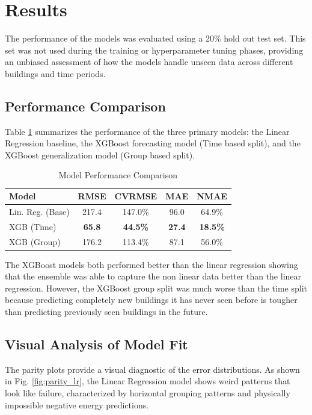 \documentclass[conference]{IEEEtran}
\begin{document}
\section{Results}
The performance of the models was evaluated using a 20\% hold out test set. This set was not used during the training or hyperparameter tuning phases, providing an unbiased assessment of how the models handle unseen data across different buildings and time periods.
\subsection{ Performance Comparison}
Table \ref{table:model_results} summarizes the performance of the three primary models: the Linear Regression baseline, the XGBoost forecasting model (Time based split), and the XGBoost generalization model (Group based split). 

\begin{table}[h]
\centering
\caption{Model Performance Comparison}
\label{table:model_results}
\setlength{\tabcolsep}{3pt}
\begin{tabular}{|l|c|c|c|c|}
\hline
\textbf{Model} & \textbf{RMSE} & \textbf{CVRMSE} & \textbf{MAE} & \textbf{NMAE} \\ \hline
Lin. Reg. (Base) & 217.4 & 147.0\% & 96.0 & 64.9\% \\ \hline
XGB (Time)       & \textbf{65.8}  & \textbf{44.5\%}  & \textbf{27.4} & \textbf{18.5\%} \\ \hline
XGB (Group)      & 176.2 & 113.4\% & 87.1 & 56.0\% \\ \hline
\end{tabular}
\end{table}

The XGBoost models both performed better than the linear regression showing that the ensemble was able to capture the non linear data better than the linear regression. However, the XGBoost group split was much worse than the time split because predicting completely new buildings it has never seen before is tougher than predicting previously seen buildings in the future.

\subsection{Visual Analysis of Model Fit}
The parity plots provide a visual diagnostic of the error distributions. As shown in Fig. \ref{fig:parity_lr}, the Linear Regression model shows weird patterns that look like failure, characterized by horizontal grouping patterns and physically impossible negative energy predictions.
\end{document}

